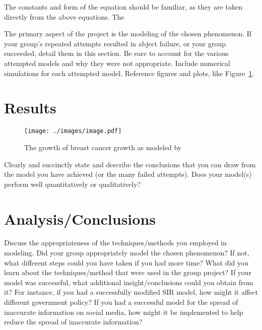 \documentclass[11pt]{amsart}
\begin{document}
The constants and form of the equation should be familiar, as they are taken directly from the above equations. The 


 The primary aspect of the project is the modeling of the chosen phenomenon. If your group's repeated attempts resulted in abject failure, or your group succeeded, detail them in this section. Be sure to account for the various attempted models and why they were not appropriate. Include numerical simulations for each attempted model.  Reference figures and plots, like Figure~\ref{fig:MeanSquaredError}.


\section{Results}

\begin{figure}[htb]
\begin{center} %
\texttt{[image: ./images/image.pdf]} %
\end{center}
\caption{The growth of breast cancer growth as modeled by
}
\label{fig:MeanSquaredError} %
\end{figure}



Clearly and succinctly state and describe the conclusions that you can draw from the model you have achieved (or the many failed attempts). Does your model(s) perform well quantitatively or qualitatively?

\section{Analysis/Conclusions}

Discuss the appropriateness of the techniques/methods you employed in modeling. Did your group appropriately model the chosen phenomenon? If not, what different steps could you have taken if you had more time? What did you learn about the techniques/method that were used in the group project? If your model was successful, what additional insight/conclusions could you obtain from it? For instance, if you had a successfully modified SIR model, how might it affect different government policy? If you had a successful model for the spread of inaccurate information on social media, how might it be implemented to help reduce the spread of inaccurate information?
\end{document}
